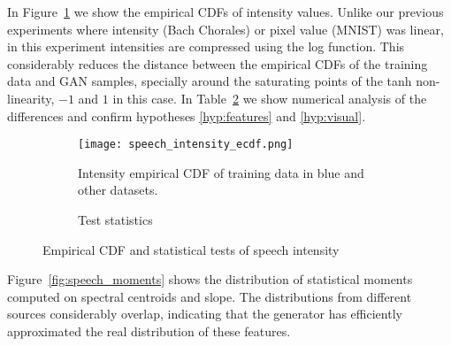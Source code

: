 In Figure~\ref{fig:speech_intensity_ecdf} we show the empirical CDFs of intensity
values. Unlike our previous experiments where intensity (Bach Chorales)
or pixel value (MNIST) was linear, in this experiment intensities are compressed using the
log function. This considerably reduces the distance between the empirical CDFs
of the training data and GAN samples,
specially around the saturating points of the tanh non-linearity, $-1$ and $1$ in this
case. In Table~\ref{tbl:speech_intensity} we show numerical analysis of the
differences and confirm hypotheses \ref{hyp:features} and \ref{hyp:visual}.
\begin{figure}[!h]
    \begin{subfigure}[b]{0.65\textwidth}
        \texttt{[image: speech\_intensity\_ecdf.png]}
        \caption{Intensity empirical CDF of training data in blue
        and other datasets.}
        \label{fig:speech_intensity_ecdf}
    \end{subfigure}
    \quad
    \begin{subfigure}[b]{0.3\textwidth}
        \caption{Test statistics}
        \label{tbl:speech_intensity}
    \end{subfigure}
    \caption{Empirical CDF and statistical tests of speech intensity}
    \label{fig:speech_intensity}
\end{figure}

Figure~\ref{fig:speech_moments} shows the distribution of statistical moments computed on
spectral centroids and slope. The distributions from different sources
considerably overlap, indicating that the generator has efficiently approximated
the real distribution of these features.


